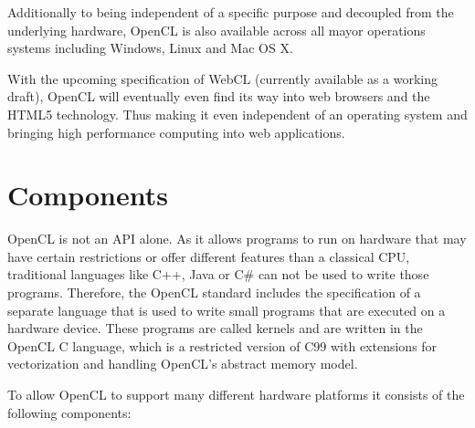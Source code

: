 Additionally to being independent of a specific purpose and decoupled from the underlying hardware, OpenCL is also available across all mayor operations systems including Windows, Linux and Mac OS X.

With the upcoming specification of WebCL (currently available as a working draft), OpenCL will eventually even find its way into web browsers and the HTML5 technology. Thus making it even independent of an operating system and bringing high performance computing into web applications.

\section{Components}

OpenCL is not an API alone. As it allows programs to run on hardware that may have certain restrictions or offer different features than a classical CPU, traditional languages like C++, Java or C\# can not be used to write those programs. Therefore, the OpenCL standard includes the specification of a separate language that is used to write small programs that are executed on a hardware device. These programs are called kernels and are written in the OpenCL C language, which is a restricted version of C99 with extensions for vectorization and handling OpenCL's abstract memory model.

\pagebreak

To allow OpenCL to support many different hardware platforms it consists of the following components:

